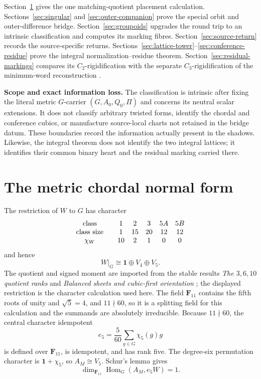 \documentclass[11pt]{article}
\theoremstyle{definition}
\theoremstyle{remark}
\newcommand{\F}{\mathbf F}
\begin{document}
Section~\ref{sec:placement} gives the one matching-quotient placement calculation.
Sections~\ref{sec:singular} and \ref{sec:outer-companion} prove the special
orbit and outer-difference bridge.  Section~\ref{sec:groupoids} upgrades the
round trip to an intrinsic classification and computes its marking fibres.
Section~\ref{sec:source-return} records the source-specific returns.
Sections~\ref{sec:lattice-tower}--\ref{sec:conference-residue} prove the integral
normalization--residue theorem.  Section~\ref{sec:residual-markings} compares
its \(C_2\)-rigidification with the separate \(C_3\)-rigidification of the
minimum-word reconstruction \cite{RuddPassant2026}.

\medskip
\noindent\textbf{Scope and exact information loss.}
The classification is intrinsic after fixing the literal metric
\(G\)-carrier \((G,A_0,Q_0,\Pi)\) and concerns its neutral scalar extensions.
It does not
classify arbitrary twisted forms, identify the chordal and conference cubics,
or manufacture source-local charts not retained in the bridge datum.  These
boundaries record the information actually present in the shadows.  Likewise,
the integral theorem does not identify the two integral lattices; it identifies
their common binary heart and the residual marking carried there.

\section{The metric chordal normal form}
\label{sec:placement}

The restriction of \(W\) to \(G\) has character
\[
\begin{array}{c@{\qquad}ccccc}
\text{class}&1&2&3&5A&5B\\
\text{class size}&1&15&20&12&12\\
\chi_W&10&2&1&0&0
\end{array}
\]
and hence
\[
 W|_G\cong\mathbf1\oplus V_4\oplus V_5.
\]
The quotient and signed moment are imported from the stable results
\emph{The \(3,6,10\) quotient ranks} and
\emph{Balanced sheets and cubic-first orientation}
\cite{RuddFactorization2026}; the displayed restriction is the character
calculation used here.  The field \(\F_{11}\) contains the fifth roots of
unity and \(\sqrt5=4\), and \(11\nmid60\), so it is a splitting field for
this calculation and the summands are absolutely irreducible.
Because \(11\nmid60\), the central character idempotent
\[
 e_5=\frac5{60}\sum_{g\in G}\chi_5(g)g
\]
is defined over \(\F_{11}\), is idempotent, and has rank five.  The
degree-six permutation character is \(\mathbf1+\chi_5\), so \(A_M\cong V_5\).
Schur's lemma gives
\[
 \dim_{\F_{11}}\operatorname{Hom}_G(A_M,e_5W)=1.
\]
\end{document}
